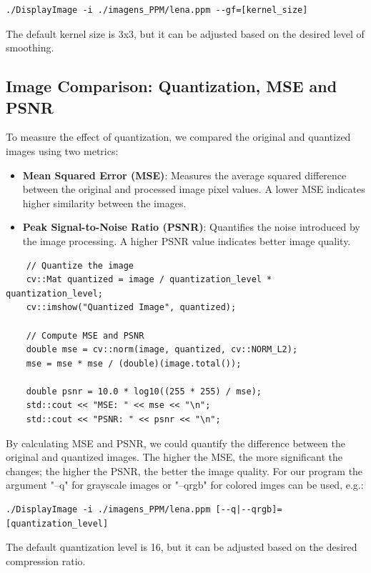 \documentclass[a4paper,12pt]{article}
\begin{document}
\lstset{basicstyle=\small\ttfamily}
\begin{lstlisting}
./DisplayImage -i ./imagens_PPM/lena.ppm --gf=[kernel_size] 
\end{lstlisting}


The default kernel size is 3x3, but it can be adjusted based on the desired level of smoothing.

\subsection{Image Comparison: Quantization, MSE and PSNR}
To measure the effect of quantization, we compared the original and quantized images using two metrics:

\begin{itemize}
    \item \textbf{Mean Squared Error (MSE)}: Measures the average squared difference between the original and processed image pixel values. A lower MSE indicates higher similarity between the images.
    \item \textbf{Peak Signal-to-Noise Ratio (PSNR)}: Quantifies the noise introduced by the image processing. A higher PSNR value indicates better image quality.
\end{itemize}
\begin{verbatim}
    // Quantize the image
    cv::Mat quantized = image / quantization_level * quantization_level;
    cv::imshow("Quantized Image", quantized);

    // Compute MSE and PSNR
    double mse = cv::norm(image, quantized, cv::NORM_L2);
    mse = mse * mse / (double)(image.total());

    double psnr = 10.0 * log10((255 * 255) / mse);
    std::cout << "MSE: " << mse << "\n";
    std::cout << "PSNR: " << psnr << "\n";
\end{verbatim}

By calculating MSE and PSNR, we could quantify the difference between the original and quantized images. The higher the MSE, the more significant the changes; the higher the PSNR, the better the image quality.
For our program the argument "--q" for grayscale images or "--qrgb" for colored imges can be used, e.g.:

\lstset{basicstyle=\footnotesize\ttfamily}
\begin{lstlisting}
./DisplayImage -i ./imagens_PPM/lena.ppm [--q|--qrgb]=[quantization_level]
\end{lstlisting}

The default quantization level is 16, but it can be adjusted based on the desired compression ratio.
\end{document}
